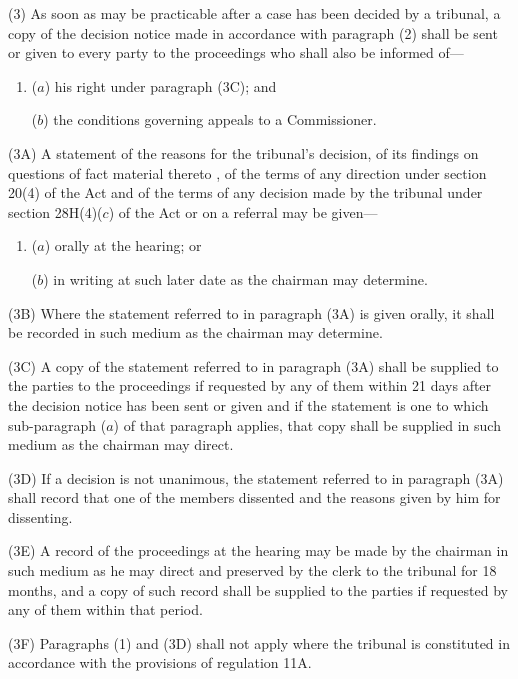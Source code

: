 \documentclass[a4paper]{article}
\begin{document}
(3) As soon as may be practicable after a case has been decided by a tribunal, a copy of the decision notice made in accordance with paragraph (2) shall be sent or given to every party to the proceedings who shall also be informed of—
\begin{enumerate}\item[]
($a$) his right under paragraph (3C); and

($b$) the conditions governing appeals to a Commissioner.
\end{enumerate}

(3A) A statement of the reasons for the tribunal’s decision, of its findings on questions of fact material thereto%
, of the terms of any direction under section 20(4) of the Act and of the terms of any decision made by the tribunal under section 28H(4)($c$) of the Act or on a referral  %
may be given—
\begin{enumerate}\item[]
($a$) orally at the hearing; or

($b$) in writing at such later date as the chairman may determine.
\end{enumerate}

(3B) Where the statement referred to in paragraph (3A) is given orally, it shall be recorded in such medium as the chairman may determine.

(3C) A copy of the statement referred to in paragraph (3A) shall be supplied to the parties to the proceedings if requested by any of them within 21 days after the decision notice has been sent or given and if the statement is one to which sub-paragraph ($a$) of that paragraph applies, that copy shall be supplied in such medium as the chairman may direct.

(3D) If a decision is not unanimous, the statement referred to in paragraph (3A) shall record that one of the members dissented and the reasons given by him for dissenting.

(3E) A record of the proceedings at the hearing may be made by the chairman in such medium as he may direct and preserved by the clerk to the tribunal for 18 months, and a copy of such record shall be supplied to the parties if requested by any of them within that period.

(3F) Paragraphs (1) and (3D) shall not apply where the tribunal is constituted in accordance with the provisions of regulation 11A.
\end{document}
